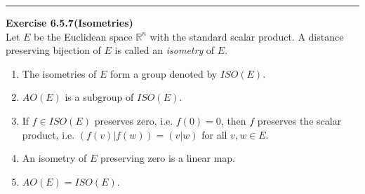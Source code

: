 \documentclass[a4paper, 12pt]{article}
\newenvironment{problem}[2][Exercise]
    { \begin{mdframed}[backgroundcolor=gray!20] \textbf{#1 #2} \\}
    {  \end{mdframed}}
\begin{document}
\noindent\rule{7in}{2.8pt}
\begin{problem}{6.5.7(Isometries)}
Let \(E\) be the Euclidean space \(\mathbb{R}^n\) with the standard scalar product. A distance preserving bijection of \(E\) is called an \textit{isometry} of \(E\). 
\begin{enumerate}
\item The isometries of \(E\) form a group denoted by \(ISO(E)\). 
\item \(AO(E)\) is a subgroup of \(ISO(E)\).
\item If \(f\in ISO(E)\) preserves zero, i.e. \(f(0)=0\), then \(f\) preserves the scalar product, i.e. \((f(v)|f(w))=(v|w)\) for all \(v,w\in E\).
\item An isometry of \(E\) preserving zero is a linear map.
\item \(AO(E)=ISO(E)\).
\end{enumerate}
\end{problem}
\end{document}
